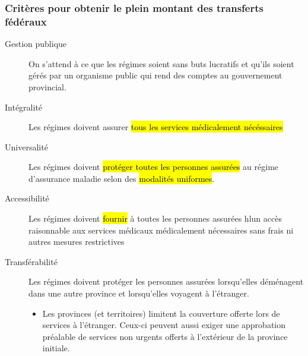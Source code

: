 \documentclass[10pt, french]{article}
\begin{document}
\begin{multicols*}{3}
\subsubsection*{Critères pour obtenir le plein montant des transferts fédéraux}
\begin{description}
\item[Gestion publique] On s'attend à ce que les régimes soient sans buts lucratifs et qu'ils soient gérés par un organisme public qui rend des comptes au gouvernement provincial. 
\item[Intégralité] Les régimes doivent assurer \hl{tous les services médicalement nécéssaires}
\item[Universalité] Les régimes doivent \hl{protéger toutes les personnes assurées} au régime d'assurance maladie selon des \hl{modalités uniformes}.
\item[Accessibilité]Les régimes doivent \hl{fournir} à toutes les personnes assurées hl{un accès raisonnable aux services médicaux médicalement nécessaires} sans frais ni autres mesures restrictives 
\item[Transférabilité] Les régimes doivent protéger les personnes assurées lorsqu'elles déménagent dans une autre province et lorsqu'elles voyagent à l'étranger.
	\begin{itemize}
	\item	Les provinces (et territoires) limitent la couverture offerte lors de services à l'étranger. Ceux-ci peuvent aussi exiger une approbation préalable de services non urgents offerts à l'extérieur de la province initiale.
	\end{itemize}
\end{description}



\end{multicols*}
\end{document}
